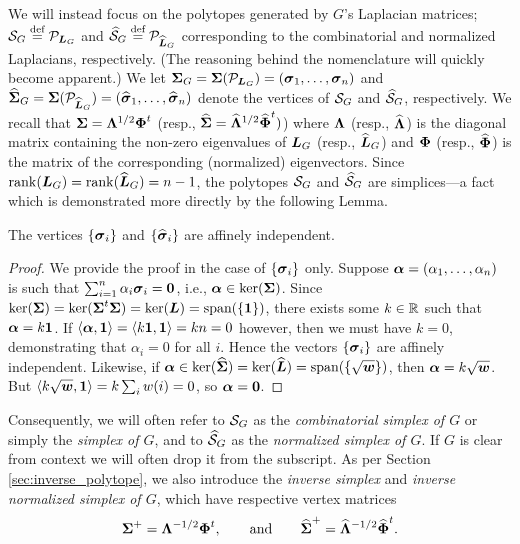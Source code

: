 We will instead focus on the polytopes generated by $G$'s Laplacian matrices;  $\mathcal{S}_G\overset{\text{def}}{=} \mathcal{P}_{\vb*{L}_G}$ and $\widehat{\mathcal{S}}_G\overset{\text{def}}{=} \mathcal{P}_{\widehat{\vb*{L}}_G}$ corresponding to the combinatorial and normalized Laplacians, respectively.  (The reasoning behind the nomenclature will quickly become apparent.)
We let $\boldsymbol{\Sigma}_G=\boldsymbol{\Sigma}(\mathcal{P}_{\vb*{L}_G})=(\vb*{\sigma}_1,\dots,\vb*{\sigma}_n)$ and $\widehat{\boldsymbol{\Sigma}}_G=\boldsymbol{\Sigma}(\mathcal{P}_{\widehat{\vb*{L}}_G})=(\widehat{\vb*{\sigma}}_1,\dots,\widehat{\vb*{\sigma}}_n)$ denote the vertices of $\mathcal{S}_G$ and $\widehat{\mathcal{S}}_G$, respectively. 
We recall that $\boldsymbol{\Sigma}=\vb{\Lambda}^{1/2}\boldsymbol{\Phi}^t$ (resp., $\widehat{\boldsymbol{\Sigma}}=\widehat{\vb{\Lambda}}^{1/2}\widehat{\boldsymbol{\Phi}}^t)$) where $\vb{\Lambda}$ (resp., $\widehat{\vb{\Lambda}}$) is the diagonal matrix containing the non-zero eigenvalues of $\vb*{L}_G$ (resp., $\widehat{\vb*{L}}_G$) and $\boldsymbol{\Phi}$ (resp., $\widehat{\boldsymbol{\Phi}}$) is the matrix of the corresponding (normalized) eigenvectors. 
Since $\rank(\vb*{L}_G)=\rank(\widehat{\vb*{L}}_G)=n-1$, the polytopes $\mathcal{S}_G$ and $\widehat{\mathcal{S}}_G$ are simplices---a fact which is demonstrated more directly by the following Lemma.  

\begin{lemma}
\label{lem:sv_affine_indep}
The vertices $\{\vb*{\sigma}_i\}$  and $\{\widehat{\vb*{\sigma}}_i\}$ are affinely independent. 
\end{lemma}
\begin{proof}
	We provide the proof in the case of $\{\vb*{\sigma}_i\}$ only. 
	Suppose $\vb*{\alpha} = (\alpha_1,\dots,\alpha_n)$ is such that 
$\sum_{i=1}^n \alpha_i\vb*{\sigma}_i = \vb{0}$, i.e., $\vb*{\alpha}\in\ker(\boldsymbol{\Sigma})$. Since $\ker(\boldsymbol{\Sigma})=\ker(\boldsymbol{\Sigma}^t\boldsymbol{\Sigma})=\ker(\vb*{L})=\textnormal{span}(\{\vb{1}\})$, there exists some $k\in \mathbb{R}$ such that $\vb*{\alpha}=k\vb{1}$. If $\langle \vb*{\alpha},\vb{1}\rangle = \langle k\vb{1},\vb{1}\rangle=kn=0$ however, then we must have $k=0$, demonstrating that $\alpha_i=0$ for all $i$. Hence the vectors $\{\vb*{\sigma}_i\}$ are affinely independent. Likewise, if $\vb*{\alpha}\in\ker(\widehat{\boldsymbol{\Sigma}})=\ker(\widehat{\vb*{L}})=\textnormal{span}(\{\sqrt{\vb*{w}}\})$, then $\vb*{\alpha}=k\sqrt{\vb*{w}}$. But $\langle k\sqrt{\vb*{w}},\vb{1}\rangle = k\sum_{i}w(i)=0$, so $\vb*{\alpha}=\vb{0}$. 
\end{proof}

Consequently, we will often refer to $\mathcal{S}_G$ as the \emph{combinatorial simplex of $G$} or simply the \emph{simplex of $G$}, and to $\widehat{\mathcal{S}}_G$ as the \emph{normalized simplex of $G$}. If $G$ is clear from context we will often drop it from the subscript. As per Section \ref{sec:inverse_polytope}, we also introduce the \emph{inverse simplex} and \emph{inverse normalized simplex of $G$}, which have respective vertex matrices
\begin{equation*}
\boldsymbol{\Sigma}^+ = \vb{\Lambda}^{-1/2}\boldsymbol{\Phi}^t,\qquad \text{and} \qquad \widehat{\boldsymbol{\Sigma}}^+ = \widehat{\vb{\Lambda}}^{-1/2}\widehat{\boldsymbol{\Phi}}^t.
\end{equation*}

